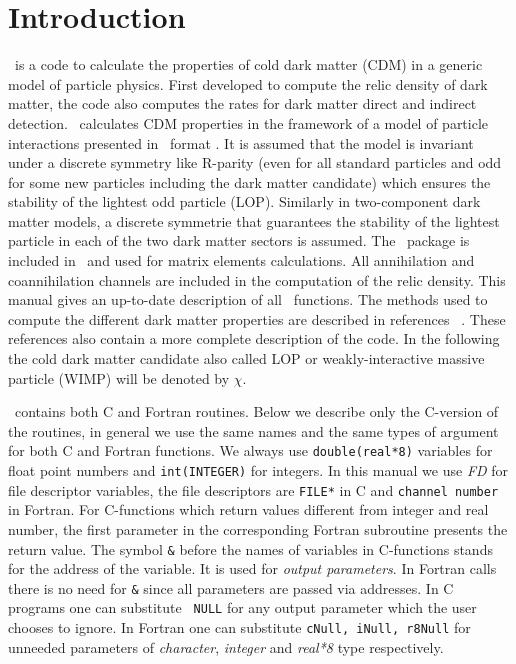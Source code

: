 \documentclass[12pt,a4paper]{article}
\begin{document}
\newpage



\section{Introduction}
\micro\ is a code 
 to calculate the properties of cold dark matter (CDM)  in a generic model of particle physics.  
 First developed to compute the relic density of dark matter, 
 the code also computes the rates for dark matter direct and  indirect detection. 
 \micro\ calculates CDM properties in the framework of a model of particle
 interactions presented in \calchep\ format \cite{Pukhov:2004ca}. 
 It is assumed that the model is invariant under  a discrete symmetry like R-parity (even for 
all standard particles and odd for some new particles including the dark matter candidate) which ensures 
the stability of the lightest  odd particle (LOP).  Similarly in two-component dark matter models,  a discrete symmetrie that guarantees the stability of the lightest particle in each of the two dark matter sectors  is assumed. The \calchep\
 package is included in \micro\ and used for matrix elements calculations.
All annihilation and coannihilation channels are included in the computation of the relic density. 
This manual gives an up-to-date description of all \micro\ functions.  
The methods used to compute the different dark matter properties are described 
in references 
~\cite{Belanger:2001fz,Belanger:2004yn,Belanger:2006is,Belanger:2008sj,Belanger:2010gh,Belanger:2013oya}.
These references also contain  a more complete description of the code. In the following
the cold dark matter candidate also called LOP or weakly-interactive massive particle (WIMP)
will be denoted by $\chi$. 

\micro\ contains both C and Fortran routines. Below we describe only the
C-version of the routines,  in general we use the same  names
 and the same types of argument for both  C and Fortran functions. 
We always use \verb|double(real*8)| variables for float point numbers and 
\verb|int(INTEGER)| for integers. In this manual we use {\it FD} for  file descriptor 
variables, the file descriptors  are  \verb|FILE*| in C and {\tt channel number} in Fortran. 
For C-functions which return values different from integer and real number,  the first parameter in the corresponding Fortran subroutine presents  the return value.  
The symbol \verb|&| before the names of variables in C-functions stands for 
the address of the variable. It is used for  {\it output
parameters}. In Fortran calls there is no need for \verb|&|
since  all parameters are passed via addresses. In C programs one  can substitute {\tt
NULL} for any output parameter which the user chooses to ignore. In Fortran  one
can substitute {\tt cNull, iNull, r8Null} for unneeded
parameters of  {\it character}, {\it integer}  and {\it real*8}  type respectively.  
\end{document}
